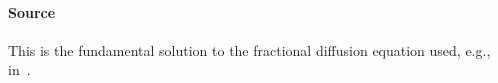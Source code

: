 % 

\paragraph{Source} This is the fundamental solution to the fractional diffusion
equation used, e.g., in~\cite{chen.hu.ea:17:space-time, chen.hu.ea:19:nonlinear,
chen.eisenberg:22:interpolating, chen.guo.ea:22:moments}.

